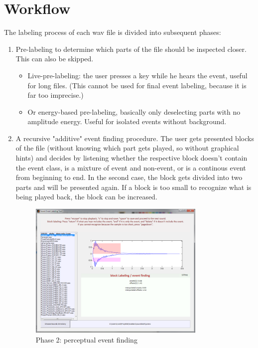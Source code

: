 \documentclass[%
paper=a4,
]
{scrartcl}
\begin{document}
\section{Workflow}
The labeling process of each wav file is divided into subsequent phases:
\begin{enumerate}
\item Pre-labeling to determine which parts of the file should be inspected closer. This can also be skipped.
\begin{itemize}
\item Live-pre-labeling: the user presses a key while he hears the event, useful for long files. (This cannot be used for final event labeling, because it is far too imprecise.)
\item Or energy-based pre-labeling, basically only deselecting parts with no amplitude energy. Useful for isolated events without background.
\end{itemize}
\item A recursive "additive" event finding procedure. The user gets presented blocks of the file (without knowing which part gets played, so without graphical hints) and decides by listening whether the respective block doesn't contain the event class, is a mixture of event and non-event, or is a continous event from beginning to end. In the second case, the block gets divided into two parts and will be presented again. If a block is too small to recognize what is being played back, the block can be increased.
\begin{figure}[h]
	\centering
		\includegraphics[width=0.80\textwidth]{phase2.png}
	\caption{Phase 2: perceptual event finding}
	\label{fig:phase2}
\end{figure}


\end{enumerate}
\end{document}
